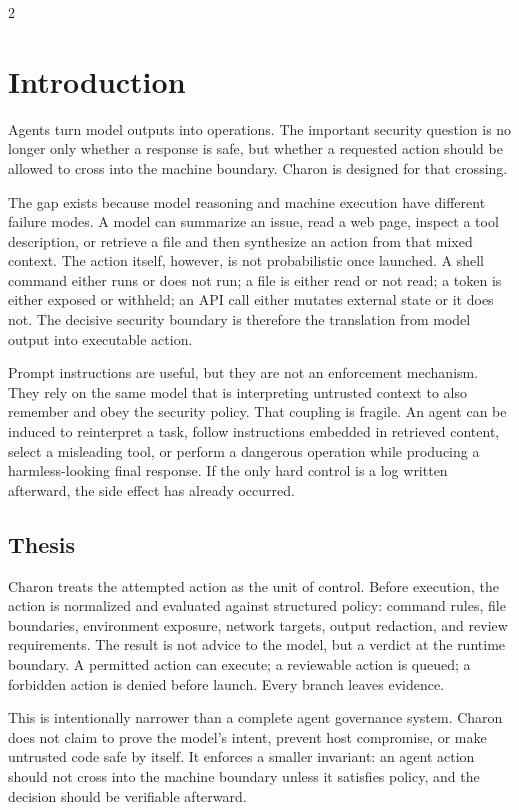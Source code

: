 \documentclass[11pt]{article}
\begin{document}
\begin{multicols}{2}

\section{Introduction}

Agents turn model outputs into operations. The important security question is no longer
only whether a response is safe, but whether a requested action should be allowed to cross
into the machine boundary. Charon is designed for that crossing.

The gap exists because model reasoning and machine execution have different failure
modes. A model can summarize an issue, read a web page, inspect a tool description, or
retrieve a file and then synthesize an action from that mixed context. The action itself,
however, is not probabilistic once launched. A shell command either runs or does not run;
a file is either read or not read; a token is either exposed or withheld; an API call
either mutates external state or it does not. The decisive security boundary is therefore
the translation from model output into executable action.

Prompt instructions are useful, but they are not an enforcement mechanism. They rely on
the same model that is interpreting untrusted context to also remember and obey the
security policy. That coupling is fragile. An agent can be induced to reinterpret a task,
follow instructions embedded in retrieved content, select a misleading tool, or perform a
dangerous operation while producing a harmless-looking final response. If the only hard
control is a log written afterward, the side effect has already occurred.

\subsection{Thesis}

Charon treats the attempted action as the unit of control. Before execution, the action is
normalized and evaluated against structured policy: command rules, file boundaries,
environment exposure, network targets, output redaction, and review requirements. The
result is not advice to the model, but a verdict at the runtime boundary. A permitted
action can execute; a reviewable action is queued; a forbidden action is denied before
launch. Every branch leaves evidence.

This is intentionally narrower than a complete agent governance system.
Charon does not claim to prove the model's intent, prevent host compromise, or make
untrusted code safe by itself. It enforces a smaller invariant: an agent action should not
cross into the machine boundary unless it satisfies policy, and the decision should be
verifiable afterward.

\end{multicols}
\end{document}
